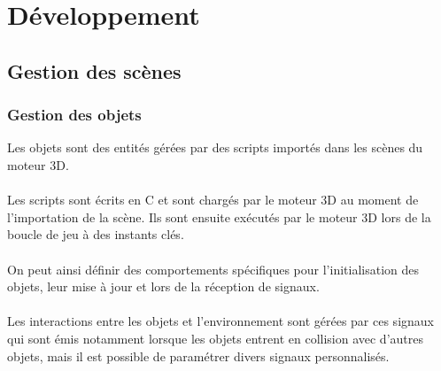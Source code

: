 \newpage
\section{Développement}



\subsection{Gestion des scènes}
\subsubsection{Gestion des objets}

Les objets sont des entités gérées par des scripts importés dans les scènes du
moteur 3D.
\\ \\
Les scripts sont écrits en C et sont chargés par le moteur 3D au moment de
l'importation de la scène. Ils sont ensuite exécutés par le moteur 3D lors de
la boucle de jeu à des instants clés.
\\ \\
On peut ainsi définir des comportements spécifiques pour l'initialisation
des objets, leur mise à jour et lors de la réception de signaux.
\\ \\
Les interactions entre les objets et l'environnement sont gérées par ces
signaux qui sont émis notamment lorsque les objets entrent en collision avec
d'autres objets, mais il est possible de paramétrer divers signaux personnalisés.

